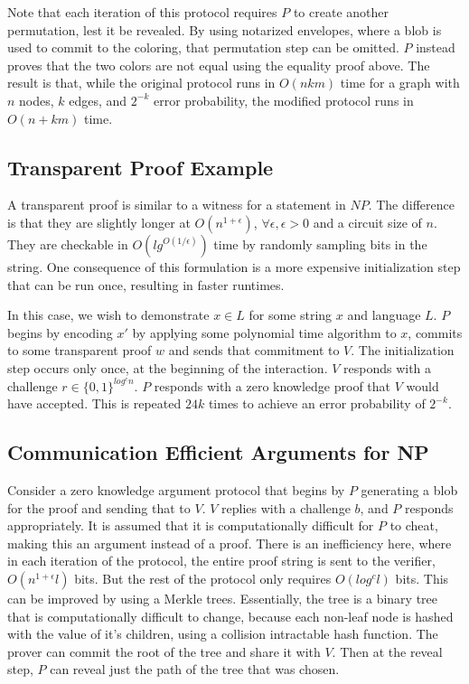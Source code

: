 \documentclass{article}
\begin{document}
Note that each iteration of this protocol requires $P$
to create another permutation, lest it be revealed. By using notarized
envelopes, where a blob is used to commit to the coloring, that
permutation step can be omitted. $P$
instead proves that the two colors are not equal using the equality
proof above. The result is that, while the original protocol runs in
$O(nkm)$
time for a graph with $n$
nodes, $k$
edges, and $2^{-k}$
error probability, the modified protocol runs in $O(n+km)$ time.

\subsection{Transparent Proof Example}

A transparent proof is similar to a witness for a statement in
$NP$.
The difference is that they are slightly longer at
$O(n^{1+\epsilon})$,
$\forall \epsilon, \epsilon > 0$
and a circuit size of $n$.
They are checkable in $O(lg^{O(1/\epsilon)})$
time by randomly sampling bits in the string. One consequence of this
formulation is a more expensive initialization step that can be run
once, resulting in faster runtimes.

In this case, we wish to demonstrate $x \in L$
for some string $x$
and language $L$.
$P$
begins by encoding $x'$
by applying some polynomial time algorithm to $x$,
commits to some transparent proof $w$
and sends that commitment to $V$.
The initialization step occurs only once, at the beginning of the
interaction. $V$
responds with a challenge $r \in \{0,1\}^{log^cn}$.
$P$
responds with a zero knowledge proof that $V$
would have accepted. This is repeated $24k$
times to achieve an error probability of $2^{-k}$.

\subsection{Communication Efficient Arguments for NP}

Consider a zero knowledge argument protocol that begins by $P$
generating a blob for the proof and sending that to $V$.
$V$
replies with a challenge $b$,
and $P$
responds appropriately. It is assumed that it is computationally
difficult for $P$
to cheat, making this an argument instead of a proof. There is an
inefficiency here, where in each iteration of the protocol, the entire
proof string is sent to the verifier, $O(n^{1+\epsilon}l)$
bits. But the rest of the protocol only requires $O(log^cl)$
bits. This can be improved by using a Merkle trees.
Essentially, the tree is a binary tree that is computationally
difficult to change, because each non-leaf node is hashed with the
value of it's children, using a collision intractable hash
function. The prover can commit the root of the tree and share it with
$V$.
Then at the reveal step, $P$
can reveal just the path of the tree that was chosen.
\end{document}
